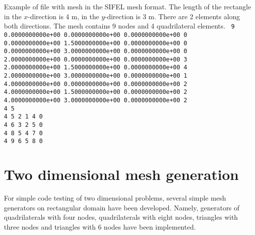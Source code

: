 \documentclass[12pt]{book}
\begin{document}
\noindent
Example of file with mesh in the SIFEL mesh format. The length of the
rectangle in the $x$-direction is 4 m, in the $y$-direction is 3 m.
There are 2 elements along both directions. The mesh contains 9 nodes
and 4 quadrilateral elements.
\noindent
{\tt
9\\
0.0000000000e+00 0.0000000000e+00 0.0000000000e+00 0 \\
0.0000000000e+00 1.5000000000e+00 0.0000000000e+00 0 \\
0.0000000000e+00 3.0000000000e+00 0.0000000000e+00 0 \\
2.0000000000e+00 0.0000000000e+00 0.0000000000e+00 3 \\
2.0000000000e+00 1.5000000000e+00 0.0000000000e+00 4 \\
2.0000000000e+00 3.0000000000e+00 0.0000000000e+00 1 \\
4.0000000000e+00 0.0000000000e+00 0.0000000000e+00 2 \\
4.0000000000e+00 1.5000000000e+00 0.0000000000e+00 2 \\
4.0000000000e+00 3.0000000000e+00 0.0000000000e+00 2 \\
4 5\\
4 5 2 1 4 0\\
4 6 3 2 5 0\\
4 8 5 4 7 0\\
4 9 6 5 8 0\\
}

\section{Two dimensional mesh generation}

For simple code testing of two dimensional problems, several simple mesh generators on rectangular
domain have been developed. Namely, generators of quadrilaterals with four nodes, quadrilaterals
with eight nodes, triangles with three nodes and triangles with 6 nodes have been implemented.


\end{document}
